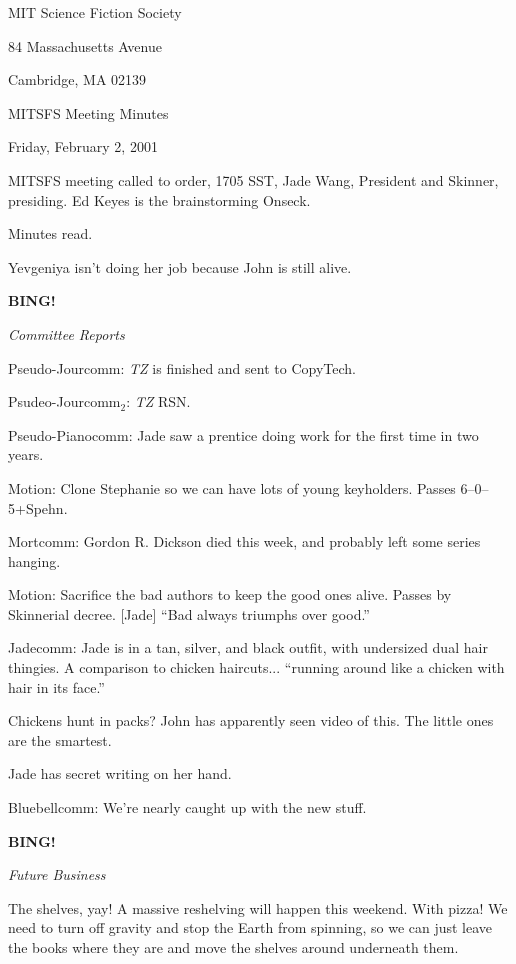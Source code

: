 \documentclass[12pt]{article}
\newcommand{\bing}{{\bf BING!} }
\newcommand{\goto}[1]{\bing \vskip 12pt \centerline{{\em{#1}}}}
\begin{document}
\begin{center}

MIT Science Fiction Society 

84 Massachusetts Avenue

Cambridge, MA 02139

\vspace{12pt}

MITSFS Meeting Minutes 

Friday, February 2, 2001

\end{center}
 
\vspace{18pt}

\setlength{\parskip}{6pt}

\noindent
MITSFS meeting called to order, 1705 SST, Jade Wang, President and
Skinner, presiding.  Ed Keyes is the brainstorming Onseck.

Minutes read.

Yevgeniya isn't doing her job because John is still alive.

\goto{Committee Reports}

Pseudo-Jourcomm: {\em TZ} is finished and sent to CopyTech.

Psudeo-Jourcomm$_2$: {\em TZ} RSN.

Pseudo-Pianocomm: Jade saw a prentice doing work for the first time
in two years.

Motion: Clone Stephanie so we can have lots of young keyholders.
Passes 6--0--5+Spehn.

Mortcomm: Gordon R. Dickson died this week, and probably left some
series hanging.

Motion: Sacrifice the bad authors to keep the good ones alive.
Passes by Skinnerial decree.  [Jade] ``Bad always triumphs over good.''

Jadecomm: Jade is in a tan, silver, and black outfit, with undersized
dual hair thingies.  A comparison to chicken haircuts... ``running
around like a chicken with hair in its face.''

Chickens hunt in packs?  John has apparently seen video of this.
The little ones are the smartest.

Jade has secret writing on her hand.

Bluebellcomm: We're nearly caught up with the new stuff.

\goto{Future Business}

The shelves, yay!  A massive reshelving will happen this weekend.
With pizza!  We need to turn off gravity and stop the Earth from
spinning, so we can just leave the books where they are and move
the shelves around underneath them.
\end{document}
